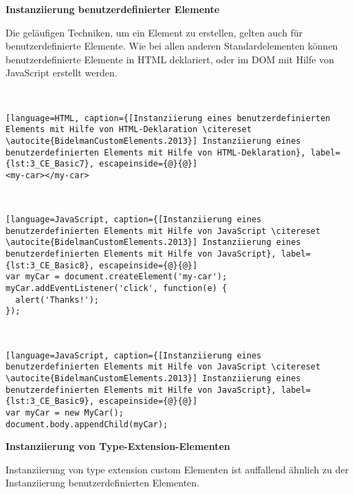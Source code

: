 \textbf{Instanziierung benutzerdefinierter Elemente}

Die geläufigen Techniken, um ein Element zu erstellen, gelten auch für benutzerdefinierte Elemente. Wie bei allen anderen Standardelementen können benutzerdefinierte Elemente in HTML deklariert, oder im DOM mit Hilfe von JavaScript erstellt werden.

\begin{enumerate}
 \hfill \\
\begin{lstlisting}[language=HTML, caption={[Instanziierung eines benutzerdefinierten Elements mit Hilfe von HTML-Deklaration \citereset \autocite{BidelmanCustomElements.2013}] Instanziierung eines benutzerdefinierten Elements mit Hilfe von HTML-Deklaration}, label={lst:3_CE_Basic7}, escapeinside={@}{@}]
<my-car></my-car>
\end{lstlisting}

 \hfill \\
\begin{lstlisting}[language=JavaScript, caption={[Instanziierung eines benutzerdefinierten Elements mit Hilfe von JavaScript \citereset \autocite{BidelmanCustomElements.2013}] Instanziierung eines benutzerdefinierten Elements mit Hilfe von JavaScript}, label={lst:3_CE_Basic8}, escapeinside={@}{@}]
var myCar = document.createElement('my-car');
myCar.addEventListener('click', function(e) {
  alert('Thanks!');
});
\end{lstlisting}

 \hfill \\
\begin{lstlisting}[language=JavaScript, caption={[Instanziierung eines benutzerdefinierten Elements mit Hilfe von JavaScript \citereset \autocite{BidelmanCustomElements.2013}] Instanziierung eines benutzerdefinierten Elements mit Hilfe von JavaScript}, label={lst:3_CE_Basic9}, escapeinside={@}{@}]
var myCar = new MyCar();
document.body.appendChild(myCar);
\end{lstlisting}
\end{enumerate}

\textbf{Instanziierung von Type-Extension-Elementen}

Instanziierung von type extension custom Elementen ist auffallend ähnlich zu der Instanziierung benutzerdefinierten Elementen.

